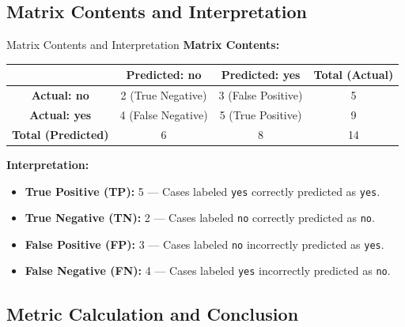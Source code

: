 \documentclass[aspectratio=169, table]{beamer}
\begin{document}
\subsection*{Matrix Contents and Interpretation}

\begin{frame}{Matrix Contents and Interpretation}
	\vspace{5pt}
	\textbf{Matrix Contents:}
	\begin{center}
		\begin{tabular}{|c|c|c|c|}
			\hline
			& \textbf{Predicted: no} & \textbf{Predicted: yes} & \textbf{Total (Actual)} \\
			\hline
			\textbf{Actual: no} & 2 (True Negative) & 3 (False Positive) & 5 \\
			\textbf{Actual: yes} & 4 (False Negative) & 5 (True Positive) & 9 \\
			\hline
			\textbf{Total (Predicted)} & 6 & 8 & 14 \\
			\hline
		\end{tabular}
	\end{center}
	
	\vspace{8pt}
	\textbf{Interpretation:}
	\begin{itemize}
		\item \textbf{True Positive (TP):} 5 — Cases labeled \texttt{yes} correctly predicted as \texttt{yes}.
		\item \textbf{True Negative (TN):} 2 — Cases labeled \texttt{no} correctly predicted as \texttt{no}.
		\item \textbf{False Positive (FP):} 3 — Cases labeled \texttt{no} incorrectly predicted as \texttt{yes}.
		\item \textbf{False Negative (FN):} 4 — Cases labeled \texttt{yes} incorrectly predicted as \texttt{no}.
	\end{itemize}
\end{frame}

\subsection*{Metric Calculation and Conclusion}
\end{document}
